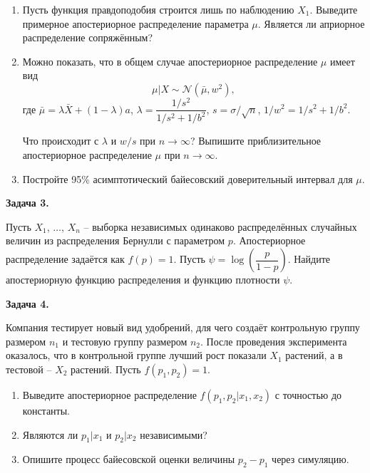 \documentclass[10pt, a4paper]{extarticle}
\begin{document}
	\begin{enumerate}[label = \alph*)]
		\item Пусть функция правдоподобия строится лишь по наблюдению $X_1$. Выведите примерное апостериорное распределение параметра $\mu$. Является ли априорное распределение сопряжённым?
		\item Можно показать, что в общем случае апостериорное распределение $\mu$ имеет вид
		\[
		\mu | X \sim \mathcal{N}(\bar{\mu}, w^2),
		\]
		где $\bar{\mu} = \lambda \bar{X} + (1 - \lambda)a$, $\lambda = \dfrac{1/s^2}{1/s^2 + 1/b^2}$, $s = \sigma / \sqrt{n}$, $1/w^2 = 1/s^2 + 1/b^2$.
		
		Что происходит с $\lambda$ и $w/s$ при $n \to \infty$? Выпишите приблизительное апостериорное распределение $\mu$ при $n \to \infty$.
		\item Постройте 95\% асимптотический байесовский доверительный интервал для $\mu$.
	\end{enumerate}
	\vspace{1em}


	{\Large \textbf{Задача 3.}}
	
	Пусть $X_1$, $\ldots$, $X_n$ -- выборка независимых одинаково распределённых случайных величин из распределения Бернулли с параметром $p$. Апостериорное распределение задаётся как $f(p) = 1$. Пусть $\psi = \log\left(\dfrac{p}{1-p}\right)$. Найдите апостериорную функцию распределения и функцию плотности $\psi$.
	\vspace{1em}
	  
	
	{\Large \textbf{Задача 4.}}
	
	Компания тестирует новый вид удобрений, для чего создаёт контрольную группу размером $n_1$ и тестовую группу размером $n_2$. После проведения эксперимента оказалось, что в контрольной группе лучший рост показали $X_1$ растений, а в тестовой -- $X_2$ растений. Пусть $f(p_1, p_2) = 1$. 
	
	\begin{enumerate}[label = \alph*)]
		\item Выведите апостериорное распределение $f(p_1, p_2 | x_1, x_2)$ с точностью до константы.
		\item Являются ли $p_1 | x_1$ и $p_2 | x_2$ независимыми?
		\item Опишите процесс байесовской оценки величины $p_2 - p_1$ через симуляцию.
	\end{enumerate}
\end{document}
